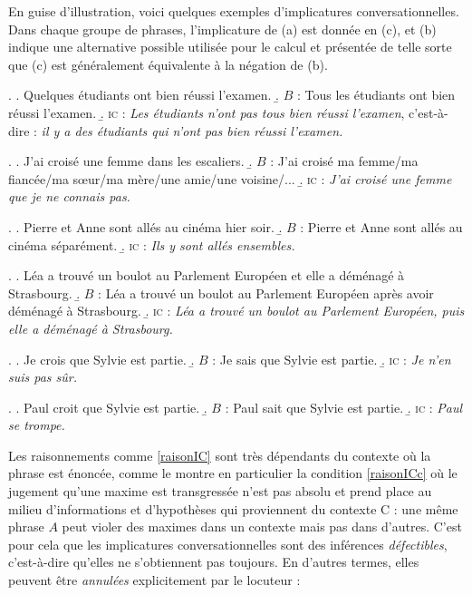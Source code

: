 \begin{refsegment}
\sloppy

En guise d'illustration, voici quelques exemples d'implicatures conversationnelles.  Dans chaque groupe de phrases, l'implicature de (a) est donnée en (c), et (b) indique une alternative possible utilisée pour le calcul et présentée de telle sorte que (c) est généralement équivalente à la négation de (b).

\fussy

\largerpage[-1]

\newcommand{\IC}{\textsc{ic}}

\ex.
\a. Quelques étudiants ont bien réussi l'examen.
\b. $B$ : Tous les étudiants ont bien réussi l'examen.
\b. {\IC} : \emph{Les étudiants n'ont pas tous bien réussi l'examen}, c'est-à-dire :
\emph{il y a des étudiants qui n'ont pas bien réussi l'examen.}

\ex.
\a. J'ai croisé une femme dans les escaliers.
\b. $B$ : J'ai croisé ma femme/ma fiancée/ma s\oe ur/ma mère/une amie/une voisine/...
\b. {\IC} : \emph{J'ai croisé une femme que je ne connais pas.}

\ex.
\a. Pierre et Anne sont allés au cinéma hier soir.
\b. $B$ : Pierre et Anne sont allés au cinéma séparément.
\b. {\IC} : \emph{Ils y sont allés ensembles.}

\ex.
\a. Léa a trouvé un boulot au Parlement Européen et elle a déménagé à Strasbourg. 
\b.  $B$ : Léa a trouvé un boulot au Parlement Européen après avoir déménagé à Strasbourg. 
\b. {\IC} : \emph{Léa a %
trouvé un boulot au Parlement Européen, puis elle a déménagé à Strasbourg.}

\ex.
\a.  Je crois que Sylvie est partie.
\b. $B$ : Je sais que Sylvie est partie.
\b. {\IC} : \emph{Je n'en suis pas sûr.}

\ex.
\a. Paul croit que Sylvie est partie.
\b. $B$ : Paul sait que Sylvie est partie.
\b. {\IC} : \emph{Paul se trompe.}



Les raisonnements comme \ref{raisonIC} sont très dépendants du contexte où la phrase est énoncée, comme le montre en particulier la condition \ref{raisonICc} où le jugement qu'une maxime est transgressée n'est pas absolu et prend place au milieu d'informations et d'hypothèses qui proviennent du contexte C : une même phrase $A$ peut violer des maximes dans un contexte mais pas dans d'autres. C'est pour cela que les implicatures conversationnelles sont des inférences \emph{défectibles}, c'est-à-dire qu'elles ne s'obtiennent pas toujours.  En d'autres termes, elles peuvent être \emph{annulées} explicitement par le locuteur : 


\end{refsegment}
